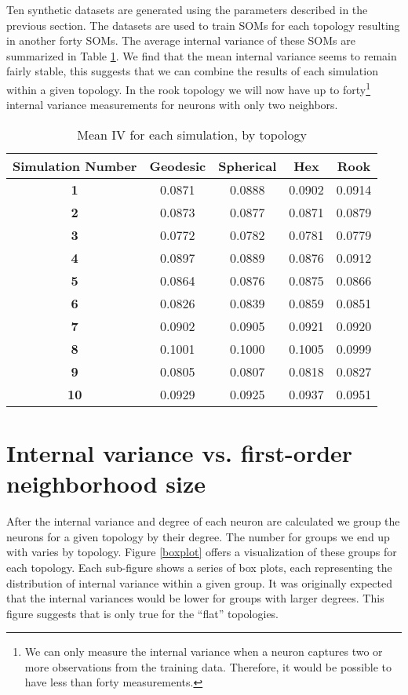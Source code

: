 Ten synthetic datasets are generated using the parameters described in the
previous section. The datasets are used to train SOMs for each topology
resulting in another forty SOMs. The average internal variance of these SOMs
are summarized in Table \ref{ivtable3}.  We find that the mean internal
variance seems to remain fairly stable, this suggests that we can combine the
results of each simulation within a given topology. In the rook topology we
will now have up to forty\footnote{We can only measure the internal variance
when a neuron captures two or more observations from the training data.
Therefore, it would be possible to have less than forty measurements.}
internal variance measurements for neurons with only two neighbors.

\begin{table}[hbt]
\centering
\caption{Mean IV for each simulation, by topology}
\label{ivtable3}
\begin{tabular}{|c||c|c|c|c|}
\hline
\textbf{Simulation Number} & Geodesic & Spherical & Hex & Rook \\
\hline
\hline
\textbf{1} & 0.0871 & 0.0888 & 0.0902 & 0.0914 \\
\hline
\textbf{2} & 0.0873 & 0.0877 & 0.0871 & 0.0879 \\
\hline
\textbf{3} & 0.0772 & 0.0782 & 0.0781 & 0.0779 \\
\hline
\textbf{4} & 0.0897 & 0.0889 & 0.0876 & 0.0912 \\
\hline
\textbf{5} & 0.0864 & 0.0876 & 0.0875 & 0.0866 \\
\hline
\textbf{6} & 0.0826 & 0.0839 & 0.0859 & 0.0851 \\
\hline
\textbf{7} & 0.0902 & 0.0905 & 0.0921 & 0.0920 \\
\hline
\textbf{8} & 0.1001 & 0.1000 & 0.1005 & 0.0999 \\
\hline
\textbf{9} & 0.0805 & 0.0807 & 0.0818 & 0.0827 \\
\hline
\textbf{10} & 0.0929 & 0.0925 & 0.0937 & 0.0951 \\
\hline
\end{tabular} \end{table}

\section{Internal variance vs. first-order neighborhood size}
After the internal variance and degree of each neuron are calculated we
group the neurons for a given topology by their degree. The number for groups
we end up with varies by topology. Figure \ref{boxplot} offers a visualization
of these groups for each topology.  Each sub-figure shows a series of box
plots, each representing the distribution of internal variance within a given
group.  It was originally expected that the internal variances would be lower
for groups with larger degrees. This figure suggests that is only true for the
``flat'' topologies.

